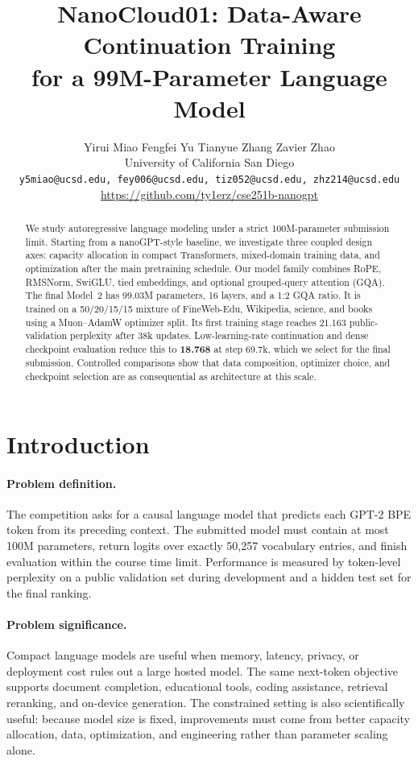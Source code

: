 \documentclass{article}
\title{NanoCloud01: Data-Aware Continuation Training\\
for a 99M-Parameter Language Model}
\author{
  Yirui Miao \quad Fengfei Yu \quad Tianyue Zhang \quad Zavier Zhao\\
  University of California San Diego\\
  \texttt{y5miao@ucsd.edu, fey006@ucsd.edu, tiz052@ucsd.edu, zhz214@ucsd.edu}\\
  \url{https://github.com/ty1erz/cse251b-nanogpt}
}
\begin{document}
\maketitle
\raggedbottom
\setlength{\parfillskip}{0pt plus 0.3\linewidth}

\begin{abstract}
We study autoregressive language modeling under a strict 100M-parameter
submission limit. Starting from a nanoGPT-style baseline, we investigate three
coupled design axes: capacity allocation in compact Transformers, mixed-domain
training data, and optimization after the main pretraining schedule. Our model
family combines RoPE, RMSNorm, SwiGLU, tied embeddings, and optional
grouped-query attention (GQA). The final Model~2 has 99.03M parameters, 16
layers, and a 1:2 GQA ratio. It is trained on a 50/20/15/15 mixture of
FineWeb-Edu, Wikipedia, science, and books using a Muon--AdamW optimizer split.
Its first training stage reaches 21.163 public-validation perplexity after 38k
updates. Low-learning-rate continuation and dense checkpoint evaluation reduce
this to \textbf{18.768} at step 69.7k, which we select for the final
submission. Controlled comparisons show that data composition, optimizer
choice, and checkpoint selection are as consequential as architecture at this
scale.
\end{abstract}

\section{Introduction}
\label{sec:introduction}

\paragraph{Problem definition.}
The competition asks for a causal language model that predicts each GPT-2 BPE
token from its preceding context. The submitted model must contain at most
100M parameters, return logits over exactly 50,257 vocabulary entries, and
finish evaluation within the course time limit. Performance is measured by
token-level perplexity on a public validation set during development and a
hidden test set for the final ranking.

\paragraph{Problem significance.}
Compact language models are useful when memory, latency, privacy, or deployment
cost rules out a large hosted model. The same next-token objective supports
document completion, educational tools, coding assistance, retrieval
reranking, and on-device generation. The constrained setting is also
scientifically useful: because model size is fixed, improvements must come from
better capacity allocation, data, optimization, and engineering rather than
parameter scaling alone.
\end{document}
